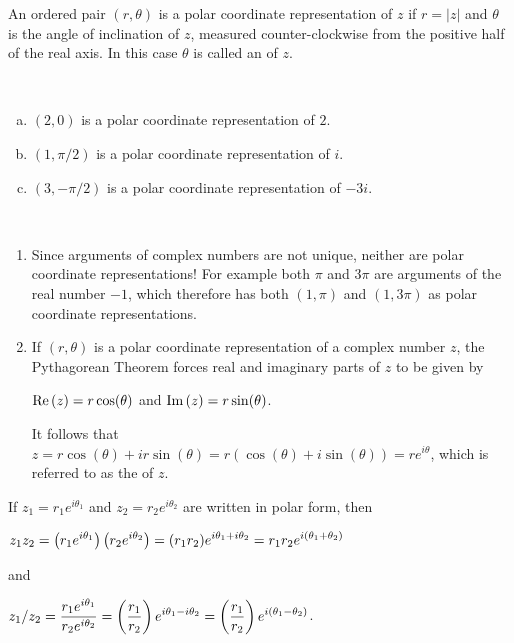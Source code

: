 \documentclass[11pt,fleqn,dvipsnames,usenames]{article}
\begin{document}
\begin{definition}
An ordered pair $(r,\theta)$ is a polar coordinate representation of $z$ if $r = |z|$ and $\theta$ is the angle of inclination of $z$, measured counter-clockwise from the positive half of the real axis.  In this case $\theta$ is called an  of $z$.
\end{definition}
%
\begin{examples}~
\begin{enumerate}[(a)]
\item $(2,0)$ is a polar coordinate representation of $2$.
\item $(1,\pi/2)$ is a polar coordinate representation of $i$.
\item $(3,-\pi/2)$ is a polar coordinate representation of $-3i$.
\end{enumerate}
\end{examples}
%
\begin{remarks}~
\begin{enumerate}[(1)]
\item Since arguments of complex numbers are not unique, neither are polar coordinate representations!  For example both $\pi$ and $3\pi$ are arguments of the real number $-1$, which therefore has both $(1,\pi)$ and $(1,3\pi)$ as polar coordinate representations.
\item If $(r,\theta)$ is a polar coordinate representation of a complex number $z$, the Pythagorean Theorem forces real and imaginary parts of $z$ to be given by
\begin{center}
$\text{Re}\left(z\right) = r\cos(\theta)$ and $\text{Im}\left(z\right) = r\sin(\theta)$.
\end{center}
It follows that $z = r\cos(\theta) + ir\sin(\theta) = r(\cos(\theta) + i\sin(\theta)) = re^{i\theta}$, which is referred to as the  of $z$.
\end{enumerate}
\end{remarks}
\newpage

\observation If $z_{1} = r_{1}e^{i\theta_{1}}$ and $z_{2} = r_{2}e^{i\theta_{2}}$ are written in polar form, then
\begin{center}
$\displaystyle{z_{1}z_{2} = \left(r_{1}e^{i\theta_{1}}\right)\left(r_{2}e^{i\theta_{2}}\right) = (r_{1}r_{2})e^{i\theta_{1} + i\theta_{2}} = r_{1}r_{2}e^{i(\theta_{1} +\theta_{2})}}$
\end{center}
and
\begin{center}
$\displaystyle{z_{1}/z_{2} = \frac{r_{1}e^{i\theta_{1}}}{r_{2}e^{i\theta_{2}}} = \left(\frac{r_{1}}{r_{2}}\right)e^{i\theta_{1} - i\theta_{2}} = \left(\frac{r_{1}}{r_{2}}\right)e^{i(\theta_{1} - \theta_{2})}}$.
\end{center}
\vsp
\end{document}
